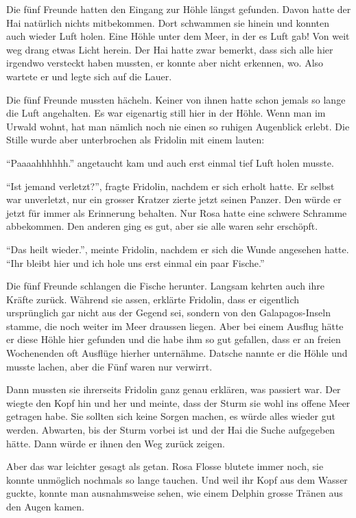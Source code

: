 Die fünf Freunde hatten den Eingang zur Höhle längst gefunden. Davon hatte der Hai natürlich nichts mitbekommen. Dort schwammen sie hinein und konnten auch wieder Luft holen. Eine Höhle unter dem Meer, in der es Luft gab! Von weit weg drang etwas Licht herein. Der Hai hatte zwar bemerkt, dass sich alle hier irgendwo versteckt haben mussten, er konnte aber nicht erkennen, wo. Also wartete er und legte sich auf die Lauer.

Die fünf Freunde mussten hächeln. Keiner von ihnen hatte schon jemals so lange die Luft angehalten. Es war eigenartig still hier in der Höhle. Wenn man im Urwald wohnt, hat man nämlich noch nie einen so ruhigen Augenblick erlebt. Die Stille wurde aber unterbrochen als Fridolin mit einem lauten: 

\enquote{Paaaahhhhhh.} angetaucht kam und auch erst einmal tief Luft holen musste.

\enquote{Ist jemand verletzt?}, fragte Fridolin, nachdem er sich erholt hatte. Er selbst war unverletzt, nur ein grosser Kratzer zierte jetzt seinen Panzer. Den würde er jetzt für immer als Erinnerung behalten. Nur Rosa hatte eine schwere Schramme abbekommen. Den anderen ging es gut, aber sie alle waren sehr erschöpft.

\enquote{Das heilt wieder.}, meinte Fridolin, nachdem er sich die Wunde angesehen hatte. \enquote{Ihr bleibt hier und ich hole uns erst einmal ein paar Fische.}

Die fünf Freunde schlangen die Fische herunter. Langsam kehrten auch ihre Kräfte zurück. Während sie assen, erklärte Fridolin, dass er eigentlich ursprünglich gar nicht aus der Gegend sei, sondern von den Galapagos-Inseln stamme, die noch weiter im Meer draussen liegen. Aber bei einem Ausflug hätte er diese Höhle hier gefunden und die habe ihm so gut gefallen, dass er an freien Wochenenden oft Ausflüge hierher unternähme. Datsche nannte er die Höhle und musste lachen, aber die Fünf waren nur verwirrt. 

Dann mussten sie ihrerseits Fridolin ganz genau erklären, was passiert war. Der wiegte den Kopf hin und her und meinte, dass der Sturm sie wohl ins offene Meer getragen habe. Sie sollten sich keine Sorgen machen, es würde alles wieder gut werden. Abwarten, bis der Sturm vorbei ist und der Hai die Suche aufgegeben hätte. Dann würde er ihnen den Weg zurück zeigen.

Aber das war leichter gesagt als getan. Rosa Flosse blutete immer noch, sie konnte unmöglich nochmals so lange tauchen. Und weil ihr Kopf aus dem Wasser guckte, konnte man ausnahmsweise sehen, wie einem Delphin grosse Tränen aus den Augen kamen.

